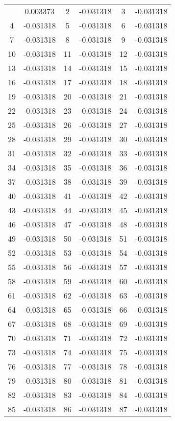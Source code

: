 \documentclass[12pt]{article}
\begin{document}
\begin{longtable}{@{}cc|cc|cc@{}}
\bottomrule
\endlastfoot
1 & 0.003373 & 2 & -0.031318 & 3 & -0.031318 \\
4 & -0.031318 & 5 & -0.031318 & 6 & -0.031318 \\
7 & -0.031318 & 8 & -0.031318 & 9 & -0.031318 \\
10 & -0.031318 & 11 & -0.031318 & 12 & -0.031318 \\
13 & -0.031318 & 14 & -0.031318 & 15 & -0.031318 \\
16 & -0.031318 & 17 & -0.031318 & 18 & -0.031318 \\
19 & -0.031318 & 20 & -0.031318 & 21 & -0.031318 \\
22 & -0.031318 & 23 & -0.031318 & 24 & -0.031318 \\
25 & -0.031318 & 26 & -0.031318 & 27 & -0.031318 \\
28 & -0.031318 & 29 & -0.031318 & 30 & -0.031318 \\
31 & -0.031318 & 32 & -0.031318 & 33 & -0.031318 \\
34 & -0.031318 & 35 & -0.031318 & 36 & -0.031318 \\
37 & -0.031318 & 38 & -0.031318 & 39 & -0.031318 \\
40 & -0.031318 & 41 & -0.031318 & 42 & -0.031318 \\
43 & -0.031318 & 44 & -0.031318 & 45 & -0.031318 \\
46 & -0.031318 & 47 & -0.031318 & 48 & -0.031318 \\
49 & -0.031318 & 50 & -0.031318 & 51 & -0.031318 \\
52 & -0.031318 & 53 & -0.031318 & 54 & -0.031318 \\
55 & -0.031318 & 56 & -0.031318 & 57 & -0.031318 \\
58 & -0.031318 & 59 & -0.031318 & 60 & -0.031318 \\
61 & -0.031318 & 62 & -0.031318 & 63 & -0.031318 \\
64 & -0.031318 & 65 & -0.031318 & 66 & -0.031318 \\
67 & -0.031318 & 68 & -0.031318 & 69 & -0.031318 \\
70 & -0.031318 & 71 & -0.031318 & 72 & -0.031318 \\
73 & -0.031318 & 74 & -0.031318 & 75 & -0.031318 \\
76 & -0.031318 & 77 & -0.031318 & 78 & -0.031318 \\
79 & -0.031318 & 80 & -0.031318 & 81 & -0.031318 \\
82 & -0.031318 & 83 & -0.031318 & 84 & -0.031318 \\
85 & -0.031318 & 86 & -0.031318 & 87 & -0.031318 \\

\end{longtable}
\end{document}
